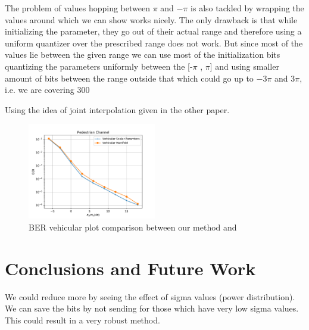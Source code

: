 \documentclass[conference]{IEEEtran}
\begin{document}
The problem of values hopping between $\pi$ and $-\pi$ is also tackled by wrapping the values around which we can show works nicely. The only drawback is that while initializing the parameter, they go out of their actual range and therefore using a uniform quantizer over the prescribed range does not work. But since most of the values lie between the given range we can use most of the initialization bits quantizing the parameters uniformly between the [-$\pi$ , $\pi$] and using smaller amount of bits between the range outside that which could go up to $-3\pi$ and $3\pi$, i.e. we are covering 300%

Using the idea of joint interpolation given in the other paper.

\begin{figure}
\includegraphics[width=0.5\textwidth]{images/vehicular_ber.pdf}
\caption{BER vehicular plot comparison between our method and \cite{Gupt1905:Predictive}}
\label{ber_overview}
\vspace{-5pt}
\end{figure}
\section{Conclusions and Future Work}
\label{section4}

We could reduce more by seeing the effect of sigma values (power distribution). We can save the bits by not sending for those which have very low sigma values. This could result in a very robust method.

\vspace{-4pt}



\end{document}
